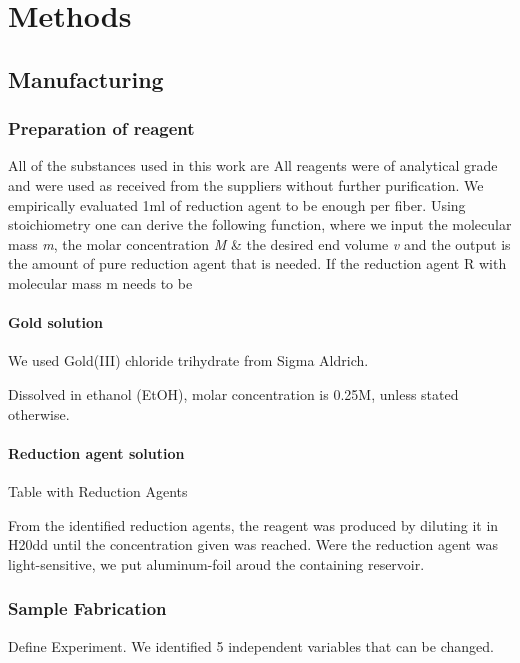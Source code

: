 \section{Methods}

\subsection{Manufacturing}

\subsubsection{Preparation of reagent}
All of the substances used in this work are 
All reagents were of analytical grade and were used as received from the suppliers
without further purification.
We empirically evaluated 1ml of reduction agent to be enough per fiber. Using stoichiometry one can derive the following function, where we input the molecular mass \textit{m}, the molar concentration \textit{M} \& the desired end volume \textit{v} and the output is the amount of pure reduction agent that is needed. 
If the reduction agent R with molecular mass m needs to be 


\paragraph{Gold solution}

We used Gold(III) chloride trihydrate from Sigma Aldrich. 

Dissolved in ethanol (EtOH), molar concentration is 0.25M, unless stated otherwise.

\paragraph{Reduction agent solution}


Table with Reduction Agents

From the identified reduction agents, the reagent was produced by diluting it in H20dd until the concentration given was reached. Were the reduction agent was light-sensitive, we put aluminum-foil aroud the containing reservoir.

\subsubsection{Sample Fabrication}

Define Experiment. We identified 5 independent variables that can be changed.


